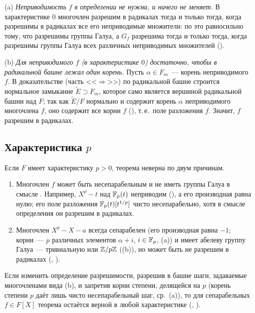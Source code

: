 \begin{remark}[3.28b]
(a) \emph{Неприводимость $f$ в определении  не нужна, и ничего не меняет.} В характеристике $0$ многочлен разрешим
в радикалах тогда и только тогда, когда разрешимы в радикалах все его неприводимые множители: по  это
равносильно тому, что разрешимы группы Галуа, а $G_f$ разрешима тогда и только тогда, когда разрешимы группы Галуа всех
различных неприводимых множителей ().

(b) \emph{Для неприводимого $f$ \textup(в характеристике $0$\textup) достаточно, чтобы в радикальной башне лежал один корень.} Пусть $\alpha\in F_m$~--- корень
неприводимого $f$. В доказательстве  (часть <<$\Rightarrow$>>) по радикальной башне строится нормальное замыкание
$\tilde E\supset F_m$, которое само является вершиной радикальной башни над $F$; так как $\tilde E/F$ нормально и содержит
корень $\alpha$ неприводимого многочлена $f$, оно содержит все корни $f$ (), т.\,е.\ поле разложения $f$. Значит,
$f$ разрешим в радикалах.
\end{remark}

\subsection*{Характеристика $p$}

\begin{remark}[3.29]
Если $F$ имеет характеристику $p>0$, теорема  неверна по двум причинам.
\begin{enumerate}[label=(\alph*)]
\item Многочлен $f$ может быть несепарабельным и не иметь группы Галуа в смысле . Например, $X^p-t$ над $\mathbb F_p(t)$
неприводим (), а его производная равна нулю; его поле разложения $\mathbb F_p(t)[t^{1/p}]$ чисто несепарабельно,
хотя в смысле определения  он разрешим в радикалах.
\item Многочлен $X^p-X-a$ всегда сепарабелен (его производная равна $-1$; корни~--- $p$ различных элементов
$\alpha+i$, $i\in\mathbb F_p$, (a)) и имеет абелеву группу Галуа~--- тривиальную или $\mathbb Z/p\mathbb Z$ ((b)), но может
быть не разрешим в радикалах (, ).
\end{enumerate}
Если изменить определение разрешимости, разрешив в башне шаги, задаваемые многочленами вида (b), и запретив корни
степени, делящейся на $p$ (корень степени $p$ даёт лишь чисто несепарабельный шаг, ср.\ (a)), то для сепарабельных
$f\in F[X]$ теорема остаётся верной в любой характеристике (, ).
\end{remark}

